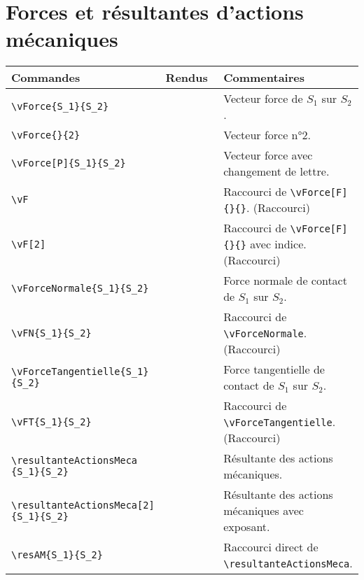 \documentclass[a4paper,12pt]{article}
\newcommand{\rac}{({\color{red}Raccourci})}
\begin{document}
	\section{Forces et résultantes d'actions mécaniques}
		\noindent
		\begin{tabular}{|p{0.4\linewidth}|p{0.2\linewidth}|p{0.4\linewidth}|}
			\hline
				\textbf{Commandes}&\textbf{Rendus}&\textbf{Commentaires}
			\\\hline\hline
				\verb!\vForce{S_1}{S_2}!				&	\vForce{S_1}{S_2}			&	Vecteur force de $S_1$ sur $S_2$.
			\\\hline
				\verb!\vForce{}{2}!					&	\vForce{}{2}				&	Vecteur force n°2.
			\\\hline
				\verb!\vForce[P]{S_1}{S_2}!				&	\vForce[P]{S_1}{S_2}			&	Vecteur force avec changement de lettre.
			\\\hline
				\verb!\vF!						&	\vF					&	Raccourci de \verb!\vForce[F]{}{}!. \rac
			\\\hline
				\verb!\vF[2]!						&	\vF[2]					&	Raccourci de \verb!\vForce[F]{}{}! avec indice. \rac
			\\\hline
				\verb!\vForceNormale{S_1}{S_2}!				&	\vForceNormale{S_1}{S_2}		&	Force normale de contact de $S_1$ sur $S_2$.
			\\\hline
				\verb!\vFN{S_1}{S_2}!					&	\vFN{S_1}{S_2}				&	Raccourci de \verb!\vForceNormale!. \rac
			\\\hline
				\verb!\vForceTangentielle{S_1}! \verb!{S_2}!		&	\vForceTangentielle{S_1}{S_2}		&	Force tangentielle de contact de $S_1$ sur $S_2$.
			\\\hline
				\verb!\vFT{S_1}{S_2}!					&	\vFT{S_1}{S_2}				&	Raccourci de \verb!\vForceTangentielle!. \rac
			\\\hline
				\verb!\resultanteActionsMeca! \verb!{S_1}{S_2}!	&	\resultanteActionsMeca{S_1}{S_2}	&	Résultante des actions mécaniques.
			\\\hline
				\verb!\resultanteActionsMeca[2]! \verb!{S_1}{S_2}!	&	\resultanteActionsMeca[2]{S_1}{S_2}	&	Résultante des actions mécaniques avec exposant.
			\\\hline
				\verb!\resAM{S_1}{S_2}!					&	\resAM{S_1}{S_2}			&	Raccourci direct de \verb!\resultanteActionsMeca!.
			\\\hline
		\end{tabular}
\end{document}
